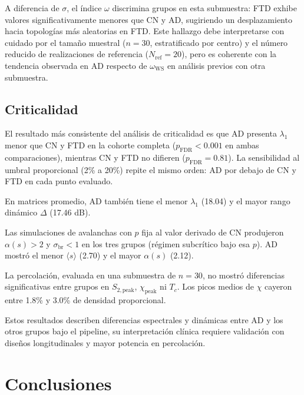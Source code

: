 \documentclass[12pt,a4paper]{article}
\begin{document}
A diferencia de $\sigma$, el índice $\omega$ discrimina grupos en esta submuestra: FTD exhibe valores significativamente menores que CN y AD, sugiriendo un desplazamiento hacia topologías más aleatorias en FTD. Este hallazgo debe interpretarse con cuidado por el tamaño muestral ($n = 30$, estratificado por centro) y el número reducido de realizaciones de referencia ($N_{\text{ref}} = 20$), pero es coherente con la tendencia observada en AD respecto de $\omega_{\text{WS}}$ en análisis previos con otra submuestra\cite{coronel2025}.

\subsection{Criticalidad}

El resultado más consistente del análisis de criticalidad es que AD presenta $\lambda_1$ menor que
CN y FTD en la cohorte completa ($p_{\text{FDR}} < 0.001$ en ambas comparaciones)\cite{larremore2011}, mientras
CN y FTD no difieren ($p_{\text{FDR}} = 0.81$). La sensibilidad al umbral proporcional (2\% a 20\%)
repite el mismo orden: AD por debajo de CN y FTD en cada punto evaluado.

En matrices promedio, AD también tiene el menor $\lambda_1$ (18.04) y el mayor rango dinámico
$\Delta$ (17.46 dB). 

Las simulaciones de avalanchas\cite{beggs2003} con $p$ fija al valor derivado de CN produjeron $\alpha(s) > 2$ y $\sigma_{\text{br}} < 1$ en los tres grupos (régimen subcrítico bajo esa $p$). AD mostró el menor $\langle s \rangle$ (2.70) y el mayor $\alpha(s)$ (2.12).

La percolación, evaluada en una submuestra de $n = 30$, no mostró diferencias significativas
entre grupos en $S_{2,\text{peak}}$, $\chi_{\text{peak}}$ ni $T_c$. Los picos medios de $\chi$
cayeron entre 1.8\% y 3.0\% de densidad proporcional.

Estos resultados describen diferencias espectrales y dinámicas entre AD y los otros grupos bajo
el pipeline, su interpretación clínica requiere validación con diseños longitudinales y mayor potencia en percolación.

\section{Conclusiones}
\end{document}
